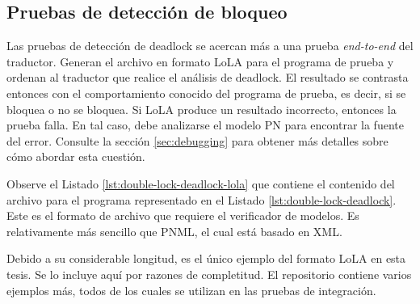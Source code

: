 \subsection{Pruebas de detección de bloqueo}

Las pruebas de detección de deadlock se acercan más a una prueba \emph{end-to-end}
del traductor. Generan el archivo en formato \acrshort{LoLA} para el programa de prueba y ordenan al
traductor que realice el análisis de deadlock. El resultado se contrasta entonces con el
comportamiento conocido del programa de prueba, es decir, si se bloquea o no se bloquea. Si
\acrshort{LoLA} produce un resultado incorrecto, entonces la prueba falla. En tal caso, debe analizarse el
modelo \acrshort{PN} para encontrar la fuente del error.
Consulte la sección \ref{sec:debugging} para obtener más
detalles sobre cómo abordar esta cuestión.

Observe el Listado \ref{lst:double-lock-deadlock-lola}
que contiene el contenido del archivo  para el programa
representado en el Listado \ref{lst:double-lock-deadlock}.
Este es el formato de archivo que requiere el verificador de
modelos. Es relativamente más sencillo que \acrshort{PNML}, el cual está basado en XML.

Debido a su considerable longitud, es el único ejemplo del formato \acrshort{LoLA} en esta tesis.
Se lo incluye aquí por razones de completitud.
El repositorio contiene varios ejemplos más,
todos de los cuales se utilizan en las pruebas de integración.

